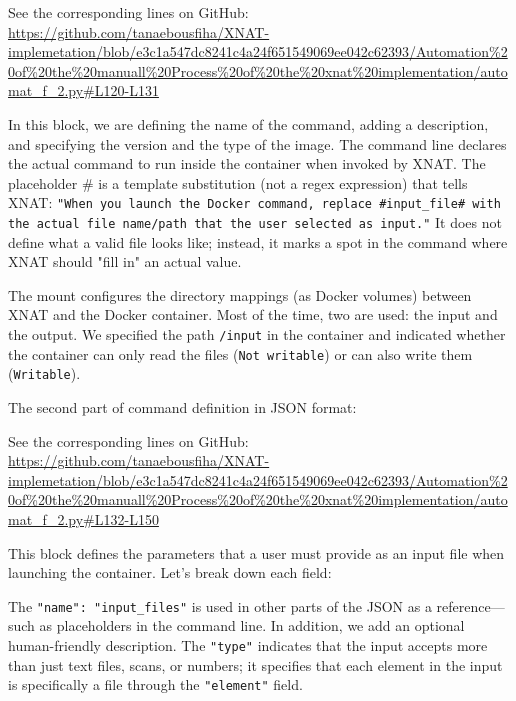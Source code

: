 \noindent\footnotesize See the corresponding lines on GitHub:\url{ https://github.com/tanaebousfiha/XNAT-implemetation/blob/e3c1a547dc8241c4a24f651549069ee042c62393/Automation%20of%20the%20manuall%20Process%20of%20the%20xnat%20implementation/automat_f_2.py#L120-L131}



In this block, we are defining the name of the command, adding a description, and specifying the version and the type of the image.
The command line declares the actual command to run inside the container when invoked by XNAT. The placeholder \# is a template substitution (not a regex expression) that tells XNAT: \texttt{"When you launch the Docker command, replace \#input\_file\# with the actual file name/path that the user selected as input."} It does not define what a valid file looks like; instead, it marks a spot in the command where XNAT should "fill in" an actual value.


The mount configures the directory mappings (as Docker volumes) between XNAT and the Docker container. Most of the time, two are used: the input and the output.
We specified the path \texttt{/input} in the container and indicated whether the container can only read the files (\texttt{Not writable}) or can also write them (\texttt{Writable}).

The second part of command definition in JSON format:




\noindent\footnotesize See the corresponding lines on GitHub: \url{ https://github.com/tanaebousfiha/XNAT-implemetation/blob/e3c1a547dc8241c4a24f651549069ee042c62393/Automation%20of%20the%20manuall%20Process%20of%20the%20xnat%20implementation/automat_f_2.py#L132-L150}


This block defines the parameters that a user must provide as an input file when launching the container.
Let’s break down each field:

The \texttt{"name": "input\_files"} is used in other parts of the JSON as a reference---such as placeholders in the command line. In addition, we add an optional human-friendly description. The \texttt{"type"} indicates that the input accepts more than just text files, scans, or numbers; it specifies that each element in the input is specifically a file through the \texttt{"element"} field.

